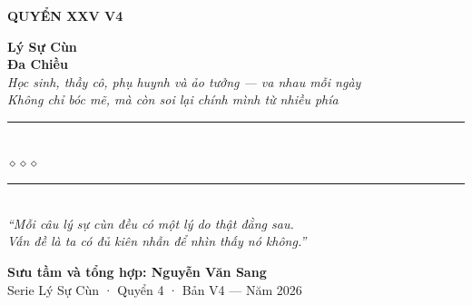 \begin{titlepage}
\begin{center}
  \begin{tcolorbox}[
    width=7cm,
    colback=sunclay!20,
    colframe=sunclay!80!black,
    arc=4pt,
    boxrule=1.5pt,
    halign=center
  ]
    {\fontsize{18}{22}\selectfont\bfseries\color{inkdark!80!black}
     QUYỂN XXV V4}
  \end{tcolorbox}
  \vspace{0.8cm}

  {\fontsize{34}{40}\selectfont\bfseries\color{inkdark!80!black}
    Lý Sự Cùn}\\[0.35cm]
  {\fontsize{34}{40}\selectfont\bfseries\color{sunclay!85!black}
    Đa Chiều}\\[0.4cm]

  {\fontsize{16}{20}\selectfont\color{sunclay!90!black}\itshape
    Học sinh, thầy cô, phụ huynh và ảo tưởng — va nhau mỗi ngày\\
    Không chỉ bóc mẽ, mà còn soi lại chính mình từ nhiều phía}\\[1cm]

  {\color{chalkgreen!60}\rule{6cm}{1pt}}\\[5pt]
  {\color{sunclay!80!black}\large$\diamond$\hspace{1cm}$\diamond$\hspace{1cm}$\diamond$}\\[5pt]
  {\color{chalkgreen!60}\rule{6cm}{1pt}}\\[1.5cm]

  {\normalsize\itshape\color{chalkgreen!90!black}
   ``Mỗi câu lý sự cùn đều có một lý do thật đằng sau.\\
   Vấn đề là ta có đủ kiên nhẫn để nhìn thấy nó không.''}

  \vfill

  {\fontsize{16}{20}\selectfont\bfseries\color{chalkgreen!90!black}
    Sưu tầm và tổng hợp: \textbf{Nguyễn Văn Sang}}\\[0.4cm]

  {\small\color{gray} Serie Lý Sự Cùn · Quyển 4 · Bản V4 --- Năm 2026}\\[0.5cm]
\end{center}

\afterpage{\nopagecolor}
\end{titlepage}